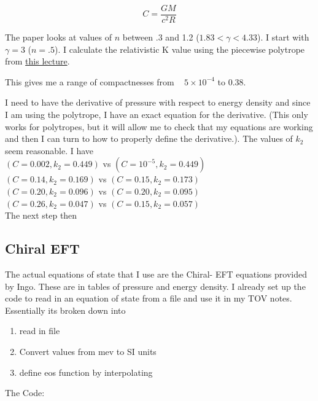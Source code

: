 \documentclass[11pt]{article}
\numberwithin{equation}{section}
\begin{document}
\begin{equation}
C = \frac{G M}{c^{2} R}
\end{equation}

The paper looks at values of $n$ between .3 and 1.2 ($1.83 < \gamma < 4.33 $). I start with $\gamma = 3$ ($n=.5$).  I calculate the relativistic K value using the piecewise polytrope from \href{https://www.ictp-saifr.org/schoolgr/Lecture2Creighton.pdf}{this lecture}.  

This gives me a range of compactnesses from ~ $5 \times 10 ^{-4}$ to 0.38.

I need to have the derivative of pressure with respect to energy density and since I am using the polytrope, I have an exact equation for the derivative.  (This only works for polytropes, but it will allow me to check that my equations are working and then I can turn to how to properly define the derivative.).  The values of $k_2$ seem reasonable.  I have \\ 
$(C = 0.002, k_2 = 0.449)$  vs  $(C = 10^{-5}, k_2 = 0.449)$ \\
$(C = 0.14, k_2 = 0.169)$  vs  $(C = 0.15, k_2 = 0.173)$ \\
$(C = 0.20, k_2 = 0.096)$  vs  $(C = 0.20, k_2 = 0.095)$ \\
$(C = 0.26, k_2 = 0.047)$  vs  $(C = 0.15, k_2 = 0.057)$ \\ 

The next step then

\subsection{Chiral EFT} 


The actual equations of state that I use are the Chiral- EFT equations provided by Ingo.  These are in tables of pressure and energy density.  I already set up the code to read in an equation of state from a file and use it in my TOV notes.   Essentially its broken down into 

\begin{enumerate}
\item read in file
\item Convert values from mev to SI units
\item define eos function by interpolating 
\end{enumerate}

The Code:
\end{document}
